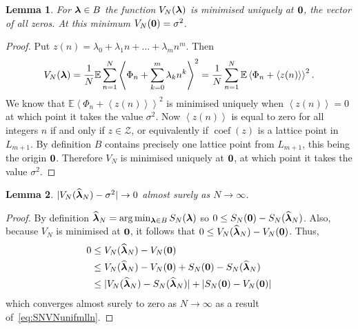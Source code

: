\documentclass[aap]{imsart}
\newcommand{\expect}{{\mathbb E}}
\newcommand{\fracpart}[1]{\left\langle #1 \right\rangle}
\newcommand{\sabs}[1]{\vert #1 \vert}
\newtheorem{lemma}{Lemma}
\newcommand{\coef}{\operatorname{coef}}
\begin{document}
\begin{lemma}\label{lem:ES_Nminimisedzero}
For $\boldsymbol{\lambda} \in B$ the function $V_N(\boldsymbol{\lambda})$ is minimised uniquely at $\boldsymbol{0}$, the vector of all zeros.  At this minimum $V_N(\boldsymbol{0}) = \sigma^2$.
\end{lemma}
\begin{proof}
Put $z(n) = \lambda_0 + \lambda_1 n + \dots + \lambda_m n^m$.  Then
\begin{align*}
V_N(\lambdabf) = \frac{1}{N}\expect\sum_{n=1}^{N}\fracpart{ \Phi_n + \sum_{k=0}^m{\lambda_k n^k} }^2 = \frac{1}{N}\sum_{n=1}^{N}\expect\fracpart{ \Phi_n + \fracpart{z(n)} }^2.
\end{align*}
We know that $\expect\fracpart{ \Phi_n + \fracpart{z(n)} }^2$ is minimised uniquely when $\fracpart{z(n)} = 0$ at which point it takes the value $\sigma^2$. Now $\fracpart{z(n)}$ is equal to zero for all integers $n$ if and only if $z \in \mathcal{Z}$, or equivalently if $\coef(z)$ is a lattice point in $L_{m+1}$. By definition $B$ contains precisely one lattice point from $L_{m+1}$, this being the origin $\boldsymbol{0}$. Therefore $V_N$ is minimised uniquely at $\boldsymbol{0}$, at which point it takes the value $\sigma^2$.
\end{proof}

\begin{lemma} \label{lem:ESNconv}
$\sabs{V_N(\widehat{\lambdabf}_N) - \sigma^2} \rightarrow 0$ almost surely as $N \rightarrow \infty$.
\end{lemma}
\begin{proof}
By definition $\widehat{\boldsymbol{\lambda}}_N =\arg\min_{\boldsymbol{\lambda}\in B} S_N(\boldsymbol{\lambda})$ so $0 \leq S_{N}(\boldsymbol{0}) - S_N(\widehat{\boldsymbol{\lambda}}_N)$.  Also, because $V_N$ is minimised at $\boldsymbol{0}$, it follows that $0 \leq V_N(\widehat{\boldsymbol{\lambda}}_N) - V_N(\boldsymbol{0})$.  Thus,
\begin{align*}
0 &\leq V_N(\widehat{\lambdabf}_N) - V_N(\zerobf) \\
 &\leq V_N(\widehat{\lambdabf}_N) - V_N(\zerobf) + S_{N}(\zerobf) - S_N(\widehat{\lambdabf}_N)   \\
&\leq \sabs{ V_N(\widehat{\lambdabf}_N) - S_N(\widehat{\lambdabf}_N) } + \sabs{ S_{N}(\zerobf) - V_N(\zerobf) }
\end{align*}
which converges almost surely to zero as $N\rightarrow\infty$ as a result of~\eqref{eq:SNVNunifmlln}.
\end{proof}
\end{document}
